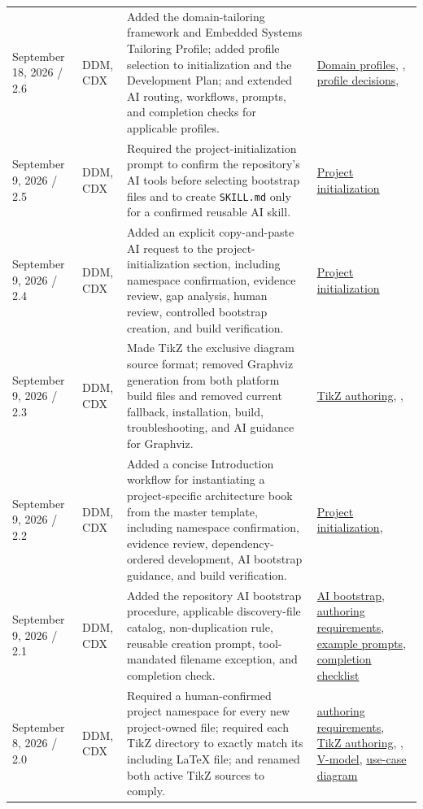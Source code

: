 \begin{tabularx}{\linewidth}{L{3.1cm}L{2.2cm}YL{2.0cm}}
September 18, 2026 / 2.6 & DDM, CDX & Added the domain-tailoring framework and Embedded Systems Tailoring Profile; added profile selection to initialization and the Development Plan; and extended AI routing, workflows, prompts, and completion checks for applicable profiles. & \hyperref[Section:DomainProfiles]{Domain profiles}, , \hyperref[Section:DevelopmentPlanProfiles]{profile decisions}, \\
September 9, 2026 / 2.5 & DDM, CDX & Required the project-initialization prompt to confirm the repository's AI tools before selecting bootstrap files and to create \texttt{SKILL.md} only for a confirmed reusable AI skill. & \hyperref[Section:InitializeNewProject]{Project initialization}\\
September 9, 2026 / 2.4 & DDM, CDX & Added an explicit copy-and-paste AI request to the project-initialization section, including namespace confirmation, evidence review, gap analysis, human review, controlled bootstrap creation, and build verification. & \hyperref[Section:InitializeNewProject]{Project initialization}\\
September 9, 2026 / 2.3 & DDM, CDX & Made TikZ the exclusive diagram source format; removed Graphviz generation from both platform build files and removed current fallback, installation, build, troubleshooting, and AI guidance for Graphviz. & \hyperref[Section:TikZAuthoring]{TikZ authoring}, , \\
September 9, 2026 / 2.2 & DDM, CDX & Added a concise Introduction workflow for instantiating a project-specific architecture book from the master template, including namespace confirmation, evidence review, dependency-ordered development, AI bootstrap guidance, and build verification. & \hyperref[Section:InitializeNewProject]{Project initialization}, \\
September 9, 2026 / 2.1 & DDM, CDX & Added the repository AI bootstrap procedure, applicable discovery-file catalog, non-duplication rule, reusable creation prompt, tool-mandated filename exception, and completion check. & \hyperref[Section:AIRepositoryBootstrap]{AI bootstrap}, \hyperref[Table:DocumentAuthoringRequirements]{authoring requirements}, \hyperref[Section:AIExamplePrompts]{example prompts}, \hyperref[Table:AICompletionChecklist]{completion checklist}\\
September 8, 2026 / 2.0 & DDM, CDX & Required a human-confirmed project namespace for every new project-owned file; required each TikZ directory to exactly match its including LaTeX file; and renamed both active TikZ sources to comply. & \hyperref[Table:DocumentAuthoringRequirements]{authoring requirements}, \hyperref[Section:TikZAuthoring]{TikZ authoring}, , \hyperref[Figure:VModel]{V-model}, \hyperref[Figure:UseCaseDiagram]{use-case diagram}\\

\end{tabularx}
